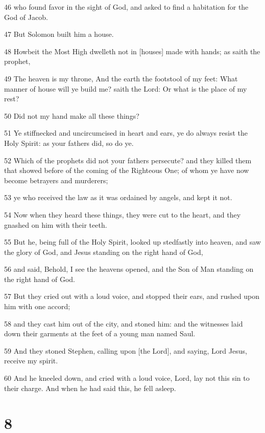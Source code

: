 \par 46 who found favor in the sight of God, and asked to find a habitation for the God of Jacob.
\par 47 But Solomon built him a house.
\par 48 Howbeit the Most High dwelleth not in [houses] made with hands; as saith the prophet,
\par 49 The heaven is my throne, And the earth the footstool of my feet: What manner of house will ye build me? saith the Lord: Or what is the place of my rest?
\par 50 Did not my hand make all these things?
\par 51 Ye stiffnecked and uncircumcised in heart and ears, ye do always resist the Holy Spirit: as your fathers did, so do ye.
\par 52 Which of the prophets did not your fathers persecute? and they killed them that showed before of the coming of the Righteous One; of whom ye have now become betrayers and murderers;
\par 53 ye who received the law as it was ordained by angels, and kept it not.
\par 54 Now when they heard these things, they were cut to the heart, and they gnashed on him with their teeth.
\par 55 But he, being full of the Holy Spirit, looked up stedfastly into heaven, and saw the glory of God, and Jesus standing on the right hand of God,
\par 56 and said, Behold, I see the heavens opened, and the Son of Man standing on the right hand of God.
\par 57 But they cried out with a loud voice, and stopped their ears, and rushed upon him with one accord;
\par 58 and they cast him out of the city, and stoned him: and the witnesses laid down their garments at the feet of a young man named Saul.
\par 59 And they stoned Stephen, calling upon [the Lord], and saying, Lord Jesus, receive my spirit.
\par 60 And he kneeled down, and cried with a loud voice, Lord, lay not this sin to their charge. And when he had said this, he fell asleep.

\chapter{8}

